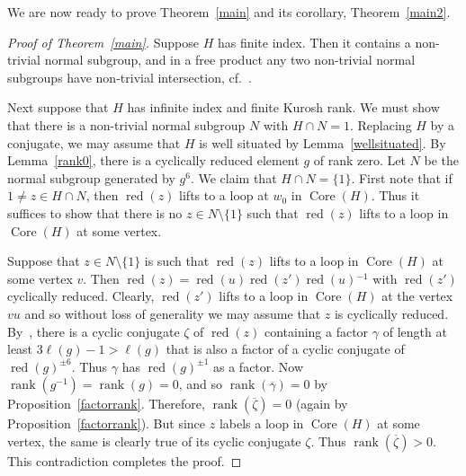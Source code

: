 \documentclass[11pt,reqno]{amsart}
\begin{document}
We are now ready to prove Theorem~\ref{main} and its corollary, Theorem~\ref{main2}.
\begin{proof}[Proof of Theorem~\ref{main}]
Suppose $H$ has finite index.  Then it contains a non-trivial normal
subgroup, and in a free product any two non-trivial normal subgroups
have non-trivial intersection, cf.~\cite[pg.~211]{KS1}.

Next suppose that $H$ has infinite index and finite Kurosh rank.  We must show that there is a non-trivial normal subgroup $N$ with $H\cap N=1$.  Replacing $H$ by a conjugate, we may assume that $H$ is well situated by Lemma~\ref{wellsituated}.  By Lemma~\ref{rank0}, there is a cyclically reduced element $g$ of rank zero.  Let $N$ be the normal subgroup generated by $g^6$. We claim that $H\cap N=\{1\}$.  First note that if $1\neq z\in H\cap N$, then ${\mathop{\mathrm{red}}\nolimits}(z)$ lifts to a loop at $w_0$ in ${\mathop{\mathrm{Core}}\nolimits}(H)$.  Thus it suffices to show that there is no $z\in N\setminus \{1\}$ such that ${\mathop{\mathrm{red}}\nolimits}(z)$ lifts to a loop in ${\mathop{\mathrm{Core}}\nolimits}(H)$ at some vertex.

Suppose that $z\in N\setminus \{1\}$ is such that ${\mathop{\mathrm{red}}\nolimits}(z)$ lifts to a loop in ${\mathop{\mathrm{Core}}\nolimits}(H)$ at some vertex $v$. Then ${\mathop{\mathrm{red}}\nolimits}(z)={\mathop{\mathrm{red}}\nolimits}(u){\mathop{\mathrm{red}}\nolimits}(z'){\mathop{\mathrm{red}}\nolimits}(u){^{-1}}$ with ${\mathop{\mathrm{red}}\nolimits}(z')$ cyclically reduced.  Clearly, ${\mathop{\mathrm{red}}\nolimits}(z')$ lifts to a loop in ${\mathop{\mathrm{Core}}\nolimits}(H)$ at the vertex $vu$ and so without loss of generality we may assume that $z$ is cyclically reduced.
By~\cite[Theorem~3.1]{DuncanHowie}, there is a cyclic conjugate $\zeta$ of ${\mathop{\mathrm{red}}\nolimits}(z)$ containing a factor $\gamma$ of length at least $3\ell(g)-1>\ell(g)$ that is also a factor of a cyclic conjugate of ${\mathop{\mathrm{red}}\nolimits}(g)^{\pm 6}$.  Thus $\gamma$ has ${\mathop{\mathrm{red}}\nolimits}(g)^{\pm 1}$ as a factor. Now ${\mathop{\mathrm{rank}}}(g{^{-1}})={\mathop{\mathrm{rank}}}(g)=0$, and so ${\mathop{\mathrm{rank}}}({\ensuremath{\overline {\gamma}}})=0$ by Proposition~\ref{factorrank}.  Therefore, ${\mathop{\mathrm{rank}}}({\ensuremath{\overline {\zeta}}})=0$ (again by Proposition~\ref{factorrank}).  But since $z$ labels a loop in ${\mathop{\mathrm{Core}}\nolimits}(H)$ at some vertex, the same is clearly true of its cyclic conjugate $\zeta$.  Thus ${\mathop{\mathrm{rank}}}({\ensuremath{\overline {\zeta}}})>0$.  This contradiction completes the proof.
\end{proof}
\end{document}
